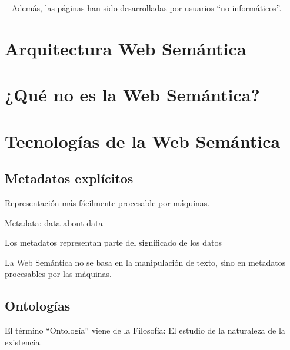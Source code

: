 – Además, las páginas han sido desarrolladas por usuarios “no informáticos”.








\section{Arquitectura Web Semántica}



\section{¿Qué no es la Web Semántica?}


\section{Tecnologías de la Web Semántica}

\subsection{Metadatos explícitos}

Representación más fácilmente procesable por máquinas.

Metadata: data about data

Los metadatos representan parte del significado de los datos

La Web Semántica no se basa en la manipulación de texto, sino en metadatos procesables por las máquinas.



\subsection{Ontologías}

El término “Ontología” viene de la Filosofía: El estudio de la naturaleza de la existencia.

